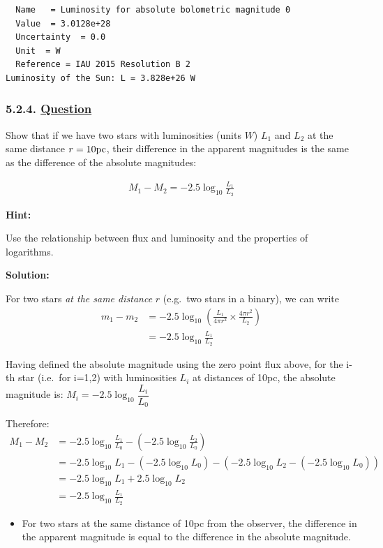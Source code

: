 \documentclass[
  letterpaper,
  DIV=11,
  numbers=noendperiod]{scrartcl}
\providecommand{\tightlist}{%
  \setlength{\itemsep}{0pt}\setlength{\parskip}{0pt}}\usepackage{longtable,booktabs,array}
\begin{document}
\begin{verbatim}
  Name   = Luminosity for absolute bolometric magnitude 0
  Value  = 3.0128e+28
  Uncertainty  = 0.0
  Unit  = W
  Reference = IAU 2015 Resolution B 2
Luminosity of the Sun: L = 3.828e+26 W
\end{verbatim}

\hypertarget{question-2}{%
\subsubsection{\texorpdfstring{5.2.4.
\protect\hyperlink{toc0_}{Question}}{5.2.4. Question}}\label{question-2}}

Show that if we have two stars with luminosities (units \(W\)) \(L_1\)
and \(L_2\) at the same distance \(r=10\rm{pc}\), their difference in
the apparent magnitudes is the same as the difference of the absolute
magnitudes:

\begin{align}
M_1 - M_2 = -2.5 \log_{10} \frac{L_1}{L_2}
\end{align}

\textbf{Hint:}

Use the relationship between flux and luminosity and the properties of
logarithms.

\textbf{Solution:}

For two stars \emph{at the same distance} \(r\) (e.g.~two stars in a
binary), we can write \begin{align}
m_1 - m_2 &= -2.5\log_{10}\left(\frac{L_1}{4\pi r^2} \times \frac{4\pi r^2}{L_2} \right)\\
&= -2.5\log_{10}\frac{L_1}{L_2}
\end{align}

Having defined the absolute magnitude using the zero point flux above,
for the i-th star (i.e.~for i=1,2) with luminosities \(L_i\) at
distances of 10pc, the absolute magnitude is:
\(M_i = -2.5 \log_{10}{\dfrac{L_i}{L_0}}\)

Therefore: \begin{align*}
M_1 - M_2 & = -2.5 \log_{10}{\frac{L_1}{L_0}} - \left(-2.5 \log_{10}{\frac{L_2}{L_0}}\right) \\
& = -2.5\log_{10} L_1 - ( -2.5\log_{10} L_0) - ( -2.5\log_{10} L_2 - ( -2.5\log_{10} L_0)) \\
& = -2.5 \log_{10} L_1 + 2.5 \log_{10} L_2\\
& = -2.5 \log_{10}{\frac{L_1}{L_2}}
\end{align*}

\begin{itemize}
\tightlist
\item
  For two stars at the same distance of 10pc from the observer, the
  difference in the apparent magnitude is equal to the difference in the
  absolute magnitude.
\end{itemize}
\end{document}
